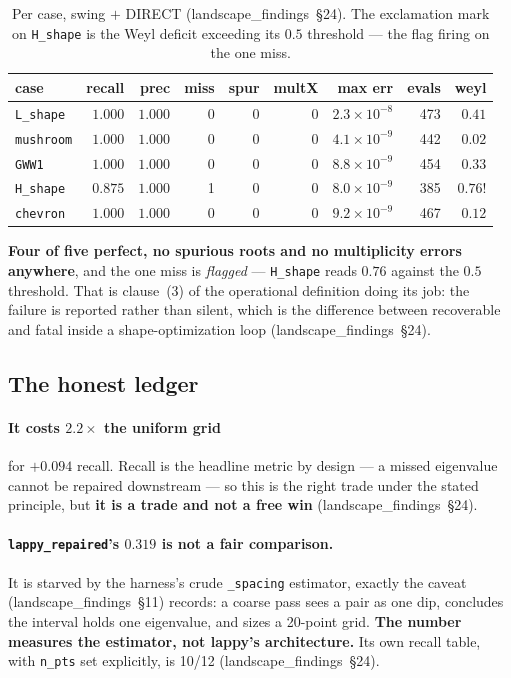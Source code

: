 \documentclass[11pt]{article}
\newcommand{\file}[1]{\texttt{#1}}
\newcommand{\lf}[1]{(landscape\_findings~\S#1)}
\begin{document}
\begin{table}[htbp]
\centering
\caption{Per case, swing $+$ DIRECT \lf{24}. The exclamation mark on \file{H\_shape} is the Weyl
deficit exceeding its $0.5$ threshold --- the flag firing on the one miss.}
\label{tab:percase}
\begin{tabular}{lrrrrrrrr}
\toprule
case & recall & prec & miss & spur & multX & max err & evals & weyl \\
\midrule
\file{L\_shape} & $1.000$ & $1.000$ & 0 & 0 & 0 & $2.3\times10^{-8}$ & 473 & $0.41$ \\
\file{mushroom} & $1.000$ & $1.000$ & 0 & 0 & 0 & $4.1\times10^{-9}$ & 442 & $0.02$ \\
\file{GWW1}     & $1.000$ & $1.000$ & 0 & 0 & 0 & $8.8\times10^{-9}$ & 454 & $0.33$ \\
\file{H\_shape} & $0.875$ & $1.000$ & 1 & 0 & 0 & $8.0\times10^{-9}$ & 385 & $0.76$\;! \\
\file{chevron}  & $1.000$ & $1.000$ & 0 & 0 & 0 & $9.2\times10^{-9}$ & 467 & $0.12$ \\
\bottomrule
\end{tabular}
\end{table}

\textbf{Four of five perfect, no spurious roots and no multiplicity errors anywhere}, and the one
miss is \emph{flagged} --- \file{H\_shape} reads $0.76$ against the $0.5$ threshold. That is
clause~(3) of the operational definition doing its job: the failure is reported rather than
silent, which is the difference between recoverable and fatal inside a shape-optimization loop
\lf{24}.

\subsection{The honest ledger}

\paragraph{It costs $2.2\times$ the uniform grid} for $+0.094$ recall. Recall is the headline
metric by design --- a missed eigenvalue cannot be repaired downstream --- so this is the right
trade under the stated principle, but \textbf{it is a trade and not a free win} \lf{24}.

\paragraph{\texttt{lappy\_repaired}'s $0.319$ is not a fair comparison.} It is starved by the
harness's crude \verb|_spacing| estimator, exactly the caveat \lf{11} records: a coarse pass sees
a pair as one dip, concludes the interval holds one eigenvalue, and sizes a 20-point grid.
\textbf{The number measures the estimator, not lappy's architecture.} Its own recall table, with
\verb|n_pts| set explicitly, is 10/12 \lf{24}.
\end{document}
